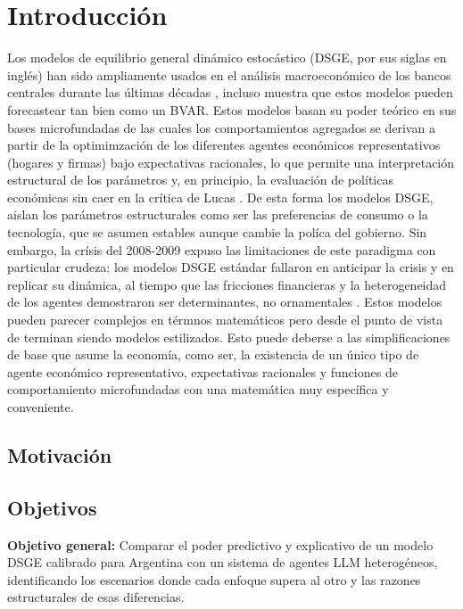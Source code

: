 
\chapter{Introducción}
\label{chap:introduccion}

Los modelos de equilibrio general dinámico estocástico (DSGE, por sus siglas en inglés)
han sido ampliamente usados en el análisis macroeconómico de los bancos centrales durante
las últimas décadas \citep{tovar2008}, incluso \citep{SmetsWouters2003} muestra que estos modelos pueden
forecastear tan bien como un BVAR. Estos modelos basan su poder teórico en sus bases
microfundadas de las cuales los comportamientos agregados se derivan a partir de la optimimzación
de los diferentes agentes económicos representativos (hogares y firmas) bajo expectativas
racionales, lo que permite una interpretación estructural
de los parámetros y, en principio, la evaluación de políticas económicas sin caer en la
crítica de Lucas \citep{Lucas1976}. De esta forma los modelos DSGE, aislan los parámetros estructurales
como ser las preferencias de consumo o la tecnología, que se asumen estables aunque cambie la políca del gobierno.
Sin embargo, la crísis del 2008-2009 expuso las limitaciones de
este paradigma con particular crudeza: los modelos DSGE estándar fallaron en anticipar
la crisis y en replicar su dinámica, al tiempo que las fricciones financieras y la
heterogeneidad de los agentes demostraron ser determinantes, no ornamentales
\citep{FagioloRoventini2017}.
Estos modelos pueden parecer complejos en térmnos matemáticos pero desde el punto de vista de \citep{tovar2008} 
terminan siendo modelos estilizados. Esto puede deberse a las simplificaciones de base que asume la economía, como ser, la existencia de un único tipo de agente económico representativo, expectativas racionales y funciones de comportamiento microfundadas con
una matemática muy específica y conveniente.

\section{Motivación}
\label{sec:motivacion}

\section{Objetivos}
\label{sec:objetivos}

\noindent\textbf{Objetivo general:} Comparar el poder predictivo y explicativo de un
modelo DSGE calibrado para Argentina con un sistema de agentes LLM heterogéneos,
identificando los escenarios donde cada enfoque supera al otro y las razones estructurales
de esas diferencias.

